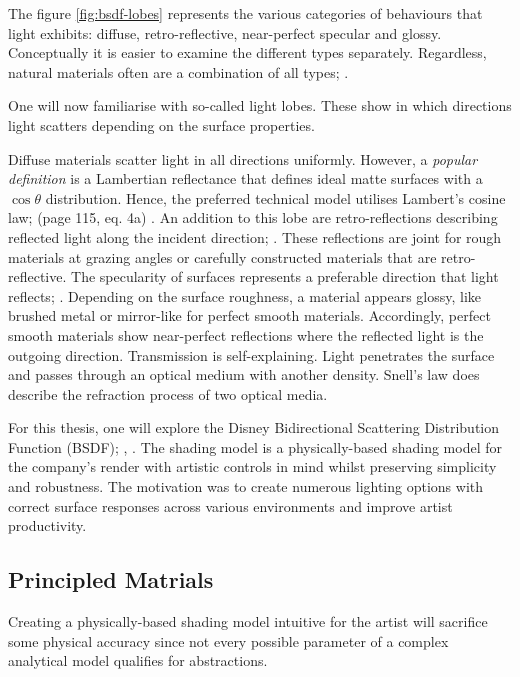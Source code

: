 The figure \ref{fig:bsdf-lobes} represents the various categories of behaviours that light exhibits: diffuse, retro-reflective, near-perfect specular and glossy.
Conceptually it is easier to examine the different types separately.
Regardless, natural materials often are a combination of all types; \cite{cook_reflectance_1982}.

One will now familiarise with so-called light lobes.
These show in which directions light scatters depending on the surface properties.

Diffuse materials scatter light in all directions uniformly.
However, a \textit{popular definition} is a Lambertian reflectance that defines ideal matte surfaces with a $\cos\theta$ distribution.
Hence, the preferred technical model utilises Lambert's cosine law; (page 115, eq. 4a) \cite{lambert_lamberts_1892}.
An addition to this lobe are retro-reflections describing reflected light along the incident direction; \cite{berns_event_2021}.
These reflections are joint for rough materials at grazing angles or carefully constructed materials that are retro-reflective.
The specularity of surfaces represents a preferable direction that light reflects; \cite{pharr_physically_2017}.
Depending on the surface roughness, a material appears glossy, like brushed metal or mirror-like for perfect smooth materials.
Accordingly, perfect smooth materials show near-perfect reflections where the reflected light is the outgoing direction.
Transmission is self-explaining.
Light penetrates the surface and passes through an optical medium with another density.
Snell's law does describe the refraction process of two optical media.

For this thesis, one will explore the Disney Bidirectional Scattering Distribution Function (BSDF); \cite{burley_physically_2012}, \cite{burley_extending_2015}.
The shading model is a physically-based shading model for the company's render with artistic controls in mind whilst preserving simplicity and robustness.
The motivation was to create numerous lighting options with correct surface responses across various environments and improve artist productivity.

\subsection{Principled Matrials}

Creating a physically-based shading model intuitive for the artist will sacrifice some physical accuracy since not every possible parameter of a complex analytical model qualifies for abstractions.

